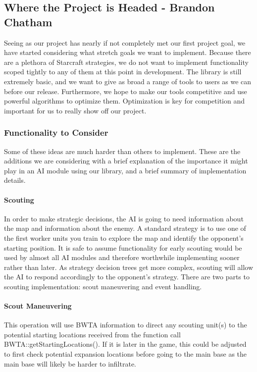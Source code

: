 \documentclass[10pt,letterpaper,onecolumn,draftclsnofoot]{IEEEtran}
\begin{document}
	\subsection{Where the Project is Headed - Brandon Chatham}
	Seeing as our project has nearly if not completely met our first project goal, we have started considering what stretch goals we want to implement. Because there are a plethora of Starcraft strategies, we do not want to implement functionality scoped tightly to any of them at this point in development. The library is still extremely basic, and we want to give as broad a range of tools to users as we can before our release. Furthermore, we hope to make our tools competitive and use powerful algorithms to optimize them. Optimization is key for competition and important for us to really show off our project.
	\subsubsection{Functionality to Consider}
	Some of these ideas are much harder than others to implement. These are the additions we are considering with a brief explanation of the importance it might play in an AI module using our library, and a brief summary of implementation details.
	\paragraph{Scouting}
	In order to make strategic decisions, the AI is going to need information about the map and information about the enemy. A standard strategy is to use one of the first worker units you train to explore the map and identify the opponent's starting position. It is safe to assume functionality for early scouting would be used by almost all AI modules and therefore worthwhile implementing sooner rather than later. As strategy decision trees get more complex, scouting will allow the AI to respond accordingly to the opponent's strategy. There are two parts to scouting implementation: scout maneuvering and event handling.
	\paragraph{Scout Maneuvering}
	This operation will use BWTA information to direct any scouting unit(s) to the potential starting locations received from the function call BWTA::getStartingLocations(). If it is later in the game, this could be adjusted to first check potential expansion locations before going to the main base as the main base will likely be harder to infiltrate. 
\end{document}
